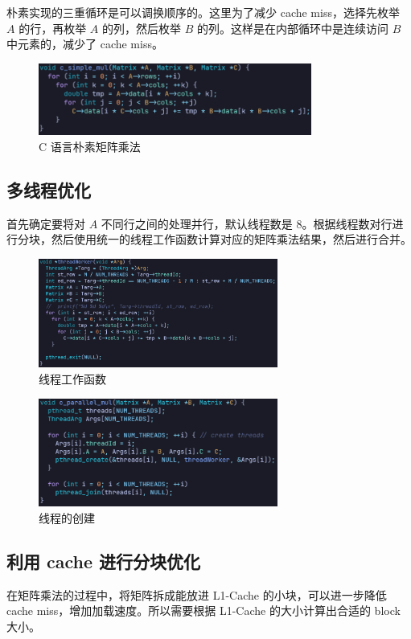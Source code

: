 \documentclass{article}
\begin{document}
朴素实现的三重循环是可以调换顺序的。这里为了减少 cache miss，选择先枚举 $A$ 的行，再枚举 $A$ 的列，然后枚举 $B$ 的列。这样是在内部循环中是连续访问 $B$ 中元素的，减少了 cache miss。
\begin{figure}[htbp]
  \centering
  \includegraphics[width=0.8\textwidth]{pics/v2code.png}
  \caption*{C 语言朴素矩阵乘法}
\end{figure}

\subsection{多线程优化}

首先确定要将对 $A$ 不同行之间的处理并行，默认线程数是 $8$。根据线程数对行进行分块，然后使用统一的线程工作函数计算对应的矩阵乘法结果，然后进行合并。
\begin{figure}[htbp]
  \centering
  \includegraphics[width=0.7\textwidth]{pics/v3code_1.png}
  \caption*{线程工作函数}
\end{figure}

\begin{figure}[htbp]
  \centering
  \includegraphics[width=0.7\textwidth]{pics/v3code_2.png}
  \caption*{线程的创建}
\end{figure}

\subsection{利用 cache 进行分块优化}
在矩阵乘法的过程中，将矩阵拆成能放进 L1-Cache 的小块，可以进一步降低 cache miss，增加加载速度。所以需要根据 L1-Cache 的大小计算出合适的 block 大小。
\end{document}
